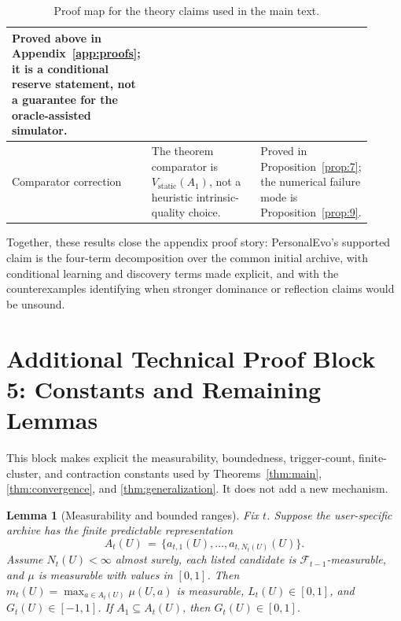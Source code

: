 \documentclass{article} %
\newtheorem{lemma}[theorem]{Lemma}
\begin{document}
\begin{table}[h]
\begin{tabular}{p{0.24\linewidth}p{0.39\linewidth}p{0.28\linewidth}}
Proved above in Appendix~\ref{app:proofs}; it is a conditional reserve statement, not a guarantee for the oracle-assisted simulator. \\
\midrule
Comparator correction &
The theorem comparator is \(V_{\mathrm{static}}(A_1)\), not a heuristic intrinsic-quality choice. &
Proved in Proposition~\ref{prop:7}; the numerical failure mode is Proposition~\ref{prop:9}. \\
\bottomrule
\end{tabular}
\caption{Proof map for the theory claims used in the main text.}
\label{tab:app-claim-map}
\end{table}

Together, these results close the appendix proof story: PersonalEvo's supported claim is the four-term decomposition over the common initial archive, with conditional learning and discovery terms made explicit, and with the counterexamples identifying when stronger dominance or reflection claims would be unsound.

\section{Additional Technical Proof Block 5: Constants and Remaining Lemmas}

\label{app:proofs-extra}

This block makes explicit the measurability, boundedness, trigger-count,
finite-cluster, and contraction constants used by
Theorems~\ref{thm:main}, \ref{thm:convergence}, and
\ref{thm:generalization}. It does not add a new mechanism.

\begin{lemma}[Measurability and bounded ranges]
\label{lem:measurable-bounded-ranges}
Fix \(t\).  Suppose the user-specific archive has the finite predictable
representation
\begin{equation}
A_t(U)
\,=\,
\{a_{t,1}(U),\ldots,a_{t,N_t(U)}(U)\}.
\end{equation}
Assume \(N_t(U)<\infty\) almost surely, each listed candidate is
\(\mathcal F_{t-1}\)-measurable, and \(\mu\) is measurable with values in
\([0,1]\).  Then \(m_t(U)=\max_{a\in A_t(U)}\mu(U,a)\) is measurable,
\(L_t(U)\in[0,1]\), and \(G_t(U)\in[-1,1]\).  If
\(A_1\subseteq A_t(U)\), then \(G_t(U)\in[0,1]\).
\end{lemma}
\end{document}
